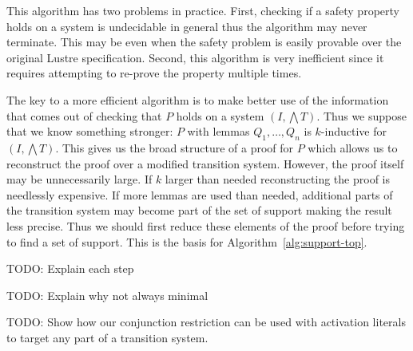 This algorithm has two problems in practice. First, checking if a
safety property holds on a system is undecidable in general thus the
algorithm may never terminate. This may be even when the safety
problem is easily provable over the original Lustre specification.
Second, this algorithm is very inefficient since it requires
attempting to re-prove the property multiple times.

The key to a more efficient algorithm is to make better use of the
information that comes out of checking that $P$ holds on a system $(I,
\bigwedge T)$. Thus we suppose that we know something stronger: $P$
with lemmas $Q_1, \ldots, Q_n$ is $k$-inductive for $(I, \bigwedge
T)$. This gives us the broad structure of a proof for $P$ which allows
us to reconstruct the proof over a modified transition system.
However, the proof itself may be unnecessarily large. If $k$ larger
than needed reconstructing the proof is needlessly expensive. If more
lemmas are used than needed, additional parts of the transition system
may become part of the set of support making the result less precise.
Thus we should first reduce these elements of the proof before trying
to find a set of support. This is the basis for
Algorithm~\ref{alg:support-top}.


TODO: Explain each step

TODO: Explain why not always minimal

TODO: Show how our conjunction restriction can be used with activation
literals to target any part of a transition system.



